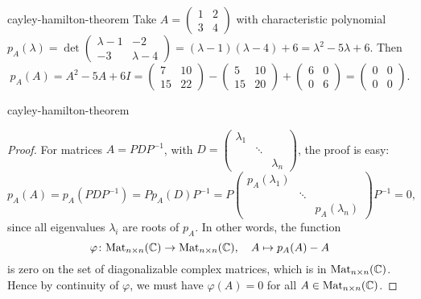 \begin{example}{cayley-hamilton-theorem}
    Take $A = \begin{pmatrix} 1 & 2 \\ 3 & 4 \end{pmatrix}$ with characteristic polynomial $p_A(\lambda) = \det \begin{pmatrix} \lambda - 1 & -2 \\ -3 & \lambda - 4 \end{pmatrix} = (\lambda - 1)(\lambda - 4)  + 6 = \lambda^2 - 5 \lambda + 6$. Then
    \[ p_A(A) = A^2 - 5A + 6I = \begin{pmatrix} 7 & 10 \\ 15 & 22 \end{pmatrix} - \begin{pmatrix} 5 & 10 \\ 15 & 20 \end{pmatrix} + \begin{pmatrix} 6 & 0 \\ 0 & 6 \end{pmatrix} = \begin{pmatrix} 0 & 0 \\ 0 & 0 \end{pmatrix} . \]
\end{example}

\begin{example}{cayley-hamilton-theorem}
    \begin{proof}
        For  matrices $A = PDP^{-1}$, with $D = \begin{pmatrix} \lambda_1 && \\ & \ddots & \\ && \lambda_n \end{pmatrix}$, the proof is easy:
        \[ p_A(A) = p_A(PDP^{-1}) = P p_A(D) P^{-1} = P \begin{pmatrix} p_A(\lambda_1) & & \\ & \ddots & \\ & & p_A(\lambda_n) \end{pmatrix} P^{-1} = 0 , \]
        since all eigenvalues $\lambda_i$ are roots of $p_A$. In other words, the function
        \[ \varphi \colon \textup{Mat}_{n \times n}(\mathbb{C}) \to \textup{Mat}_{n \times n}(\mathbb{C}), \quad A \mapsto p_A(A) - A \]
        is zero on the set of diagonalizable complex matrices, which is  in $\textup{Mat}_{n \times n}(\mathbb{C})$. Hence by continuity of $\varphi$, we must have $\varphi(A) = 0$ for all $A \in \textup{Mat}_{n \times n}(\mathbb{C})$.
    \end{proof}
\end{example}

